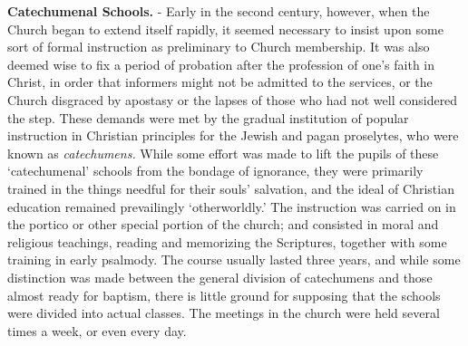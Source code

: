 \documentclass[]{book}
\begin{document}
\textbf{Catechumenal Schools.} - Early in the second century, however, when the Church began to extend itself rapidly, it seemed necessary to insist upon some sort of formal instruction as preliminary to Church membership. It was also deemed wise to fix a period of probation after the profession of one's faith in Christ, in order that informers might not be admitted to the services, or the Church disgraced by apostasy or the lapses of those who had not well considered the step. These demands were met by the gradual institution of popular instruction in Christian principles for the Jewish and pagan proselytes, who were known as \emph{catechumens.} While some effort was made to lift the pupils of these `catechumenal' schools from the bondage of ignorance, they were primarily trained in the things needful for their souls' salvation, and the ideal of Christian education remained prevailingly `otherworldly.' The instruction was carried on in the portico or other special portion of the church; and consisted in moral and religious teachings, reading and memorizing the Scriptures, together with some training in early psalmody. The course usually lasted three years, and while some distinction was made between the general division of catechumens and those almost ready for baptism, there is little ground for supposing that the schools were divided into actual classes. The meetings in the church were held several times a week, or even every day.
\end{document}
